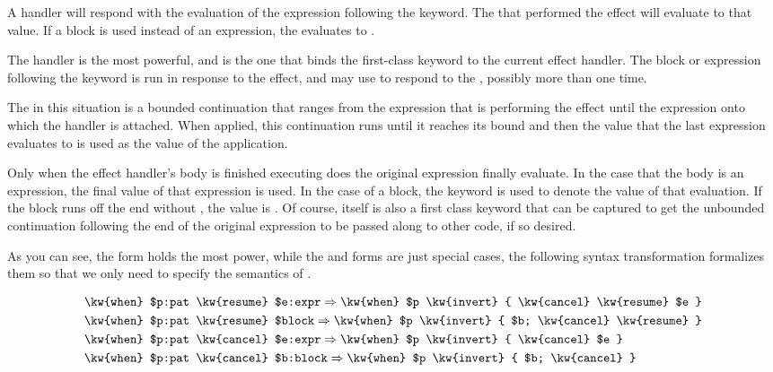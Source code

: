 A  handler will respond with the evaluation of the expression following
the keyword. The  that performed the effect will evaluate to that value.
If a block is used instead of an expression, the  evaluates to .

The  handler is the most powerful, and is the one that binds the
first-class keyword  to the current effect handler. The block or expression
following the  keyword is run in response to the effect, and may use  to
respond to the , possibly more than one time.

The  in this situation is a bounded continuation that ranges from the
 expression that is performing the effect until the expression onto
which the handler is attached. When applied, this continuation runs until it reaches
its bound and then the value that the last expression evaluates to is used as the
value of the  application.

Only when the effect handler's body is finished executing does the original
expression finally evaluate. In the case that the body is an expression, the
final value of that expression is used. In the case of a block, the 
keyword is used to denote the value of that evaluation. If the block runs off
the end without , the value is . Of course,  itself
is also a first class keyword that can be captured to get the unbounded continuation
following the end of the original expression to be passed along to other code, if
so desired.

As you can see, the  form holds the most power, while the 
and  forms are just special cases, the following syntax transformation
formalizes them so that we only need to specify the semantics of .

\begin{align*}
    & \texttt{\kw{when} \$p:pat \kw{resume} \$e:expr} \Rightarrow \texttt{\kw{when} \$p \kw{invert} \{ \kw{cancel} \kw{resume} \$e \}} \\ %
    & \texttt{\kw{when} \$p:pat \kw{resume} \$block} \Rightarrow \texttt{\kw{when} \$p \kw{invert} \{ \$b; \kw{cancel} \kw{resume} \}} \\ %
    & \texttt{\kw{when} \$p:pat \kw{cancel} \$e:expr} \Rightarrow \texttt{\kw{when} \$p \kw{invert} \{ \kw{cancel} \$e \}} \\ %
    & \texttt{\kw{when} \$p:pat \kw{cancel} \$b:block} \Rightarrow \texttt{\kw{when} \$p \kw{invert} \{ \$b; \kw{cancel} \}} \\ %
\end{align*}

